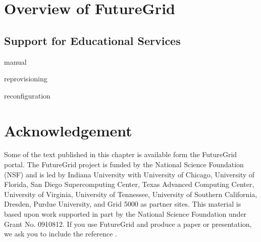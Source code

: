 \documentclass{article}
\begin{document}



\section{Overview of FutureGrid}












\subsection{Support for Educational Services}

manual

reprovisioning

reconfiguration








\section*{Acknowledgement}

Some of the text published in this chapter is available form the
FutureGrid portal. The FutureGrid project is funded by the National
Science Foundation (NSF) and is led by Indiana University with
University of Chicago, University of Florida, San Diego Supercomputing
Center, Texas Advanced Computing Center, University of Virginia,
University of Tennessee, University of Southern California, Dresden,
Purdue University, and Grid 5000 as partner sites. This material is
based upon work supported in part by the National Science Foundation
under Grant No. 0910812. If you use FutureGrid and produce a paper or
presentation, we ask you to include the reference
\cite{las2010gce,las12fg-bookchapter}.




\appendix


\end{document}
